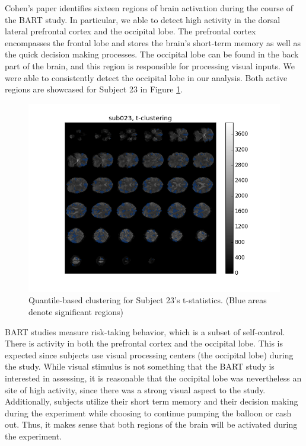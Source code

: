 \par \indent Cohen's paper identifies sixteen regions of brain activation 
during the course of the BART study. In particular, we able to detect 
high activity in the dorsal lateral prefrontal cortex and the occipital lobe. 
The prefrontal cortex encompasses the frontal lobe and stores 
the brain's short-term memory as well as the quick decision making processes. 
The occipital lobe can be found in the back part of the brain, and this region
is responsible for processing visual inputs. We were able to consistently detect
the occipital lobe in our analysis. Both active regions are showcased 
for Subject 23 in Figure \ref{fig:clustersub23}.

\begin{figure}[ht]
\centering
	\includegraphics[width=.8\linewidth]{../images/sub023_t_overlay.png} 
	\caption{Quantile-based clustering for Subject 23's t-statistics. 
	(Blue areas denote significant regions)}
	\label{fig:clustersub23}
\end{figure}

\par BART studies measure risk-taking behavior, which is a subset of 
self-control. There is activity in both the prefrontal cortex and the 
occipital lobe. This is expected since subjects use visual processing 
centers (the occipital lobe) during the study. While 
visual stimulus is not something that the BART study is interested in 
assessing, it is reasonable that the occipital lobe was nevertheless an site 
of high activity, since there was a strong visual aspect to the study. 
Additionally, subjects utilize 
their short term memory and their decision making during the experiment while
choosing to continue pumping the balloon or cash out. Thus, it makes sense 
that both regions of the brain will be activated during the experiment. 

